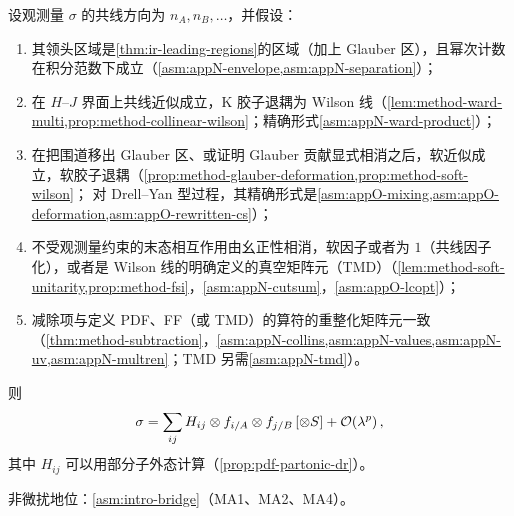 \begin{theorem}\label{thm:method-template}
设观测量 $\sigma$ 的共线方向为 $n_A,n_B,\ldots$，并假设：
\begin{enumerate}[label=\textbf{(H\arabic*)},leftmargin=3.2em,itemsep=1pt,topsep=2pt]
\item 其领头区域是\cref{thm:ir-leading-regions}的区域（加上 Glauber 区），且幂次计数在积分范数下成立（\cref{asm:appN-envelope,asm:appN-separation}）；
\item 在 $H$--$J$ 界面上共线近似成立，K 胶子退耦为 Wilson 线（\cref{lem:method-ward-multi,prop:method-collinear-wilson}；精确形式\cref{asm:appN-ward-product}）；
\item 在把围道移出 Glauber 区、或证明 Glauber 贡献显式相消之后，软近似成立，软胶子退耦（\cref{prop:method-glauber-deformation,prop:method-soft-wilson}；
  对 Drell--Yan 型过程，其精确形式是\cref{asm:appO-mixing,asm:appO-deformation,asm:appO-rewritten-cs}）；
\item 不受观测量约束的末态相互作用由幺正性相消，软因子或者为 $1$（共线因子化），或者是 Wilson 线的明确定义的真空矩阵元（TMD）（\cref{lem:method-soft-unitarity,prop:method-fsi}，\cref{asm:appN-cutsum}，\cref{asm:appO-lcopt}）；
\item 减除项与定义 PDF、FF（或 TMD）的算符的重整化矩阵元一致（\cref{thm:method-subtraction}，\cref{asm:appN-collins,asm:appN-values,asm:appN-uv,asm:appN-multren}；TMD 另需\cref{asm:appN-tmd}）。
\end{enumerate}
则
\begin{equation}\label{eq:method-template}
\sigma=\sum_{ij}H_{ij}\otimes f_{i/A}\otimes f_{j/B}\,[\otimes S]+\mathcal{O}\!\left(\lambda^p\right) ,
\end{equation}
其中 $H_{ij}$ 可以用部分子外态计算（\cref{prop:pdf-partonic-dr}）。

非微扰地位：\cref{asm:intro-bridge}（MA1、MA2、MA4）。
\end{theorem}

